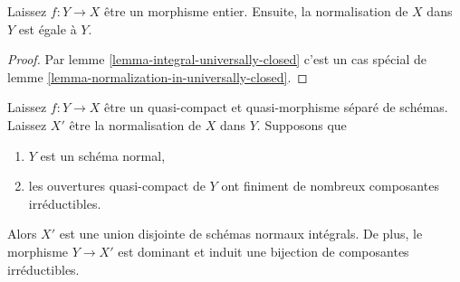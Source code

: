 \begin{lemma}

\label{lemma-normalization-in-integral}
Laissez $f : Y \to X$ être un morphisme entier. Ensuite, la normalisation de $X$ dans $Y$ est égale à $Y$.
\end{lemma}

\begin{proof}
Par lemme \ref{lemma-integral-universally-closed} c'est un cas spécial de lemme \ref{lemma-normalization-in-universally-closed}.
\end{proof}

\begin{lemma}

\label{lemma-normal-normalization}
Laissez $f : Y \to X$ être un quasi-compact et quasi-morphisme séparé de schémas. Laissez $X'$ être la normalisation de $X$ dans $Y$. Supposons que
\begin{enumerate}
\item $Y$ est un schéma normal,
\item les ouvertures quasi-compact de $Y$ ont finiment de nombreux composantes irréductibles.
\end{enumerate}
Alors $X'$ est une union disjointe de schémas normaux intégrals. De plus, le morphisme $Y \to X'$ est dominant et induit une bijection de composantes irréductibles.
\end{lemma}


